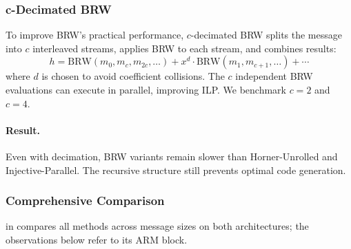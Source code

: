 \subsubsection{c-Decimated BRW}

To improve BRW's practical performance, $c$-decimated BRW splits the message into
$c$ interleaved streams, applies BRW to each stream, and combines results:
\[
h = \text{BRW}(m_0, m_c, m_{2c}, \ldots) + x^d \cdot \text{BRW}(m_1, m_{c+1}, \ldots) + \cdots
\]
where $d$ is chosen to avoid coefficient collisions.
The $c$ independent BRW evaluations can execute in parallel, improving ILP.
We benchmark $c = 2$ and $c = 4$.

\paragraph{Result.}
Even with decimation, BRW variants remain slower than Horner-Unrolled and Injective-Parallel.
The recursive structure still prevents optimal code generation.

\subsubsection{Comprehensive Comparison}
 in  compares all
methods across message sizes on both architectures; the observations below
refer to its ARM block.



